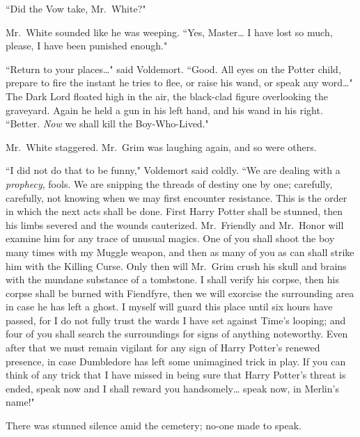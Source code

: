 ``Did the Vow take, Mr.~White?"

Mr.~White sounded like he was weeping. ``Yes, Master{\ldots} I have lost so much, please, I have been punished enough."

``Return to your places{\ldots}" said Voldemort. ``Good. All eyes on the Potter child, prepare to fire the instant he tries to flee, or raise his wand, or speak any word{\ldots}" The Dark Lord floated high in the air, the black-clad figure overlooking the graveyard. Again he held a gun in his left hand, and his wand in his right. ``Better. \emph{Now} we shall kill the Boy-Who-Lived."

Mr.~White staggered. Mr.~Grim was laughing again, and so were others.

``I did not do that to be funny," Voldemort said coldly. ``We are dealing with a \emph{prophecy}, fools. We are snipping the threads of destiny one by one; carefully, carefully, not knowing when we may first encounter resistance. This is the order in which the next acts shall be done. First Harry Potter shall be stunned, then his limbs severed and the wounds cauterized. Mr.~Friendly and Mr.~Honor will examine him for any trace of unusual magics. One of you shall shoot the boy many times with my Muggle weapon, and then as many of you as can shall strike him with the Killing Curse. Only then will Mr.~Grim crush his skull and brains with the mundane substance of a tombstone. I shall verify his corpse, then his corpse shall be burned with Fiendfyre, then we will exorcise the surrounding area in case he has left a ghost. I myself will guard this place until six hours have passed, for I do not fully trust the wards I have set against Time's looping; and four of you shall search the surroundings for signs of anything noteworthy. Even after that we must remain vigilant for any sign of Harry Potter's renewed presence, in case Dumbledore has left some unimagined trick in play. If you can think of any trick that I have missed in being sure that Harry Potter's threat is ended, speak now and I shall reward you handsomely{\ldots} speak now, in Merlin's name!"

There was stunned silence amid the cemetery; no-one made to speak.

